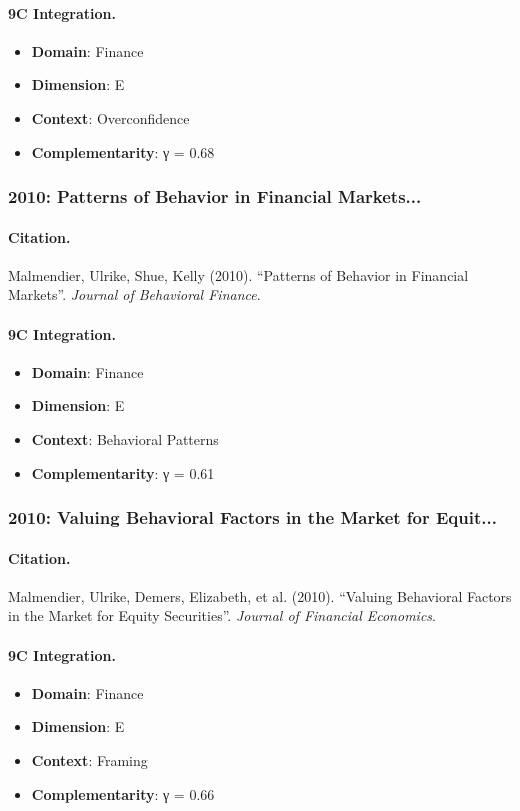 \paragraph{9C Integration.}
\begin{itemize}[nosep]
  \item \textbf{Domain}: Finance
  \item \textbf{Dimension}: E
  \item \textbf{Context}: Overconfidence
  \item \textbf{Complementarity}: γ = 0.68
\end{itemize}


\subsubsection{2010: Patterns of Behavior in Financial Markets...}

\paragraph{Citation.}
Malmendier, Ulrike, Shue, Kelly (2010). ``Patterns of Behavior in Financial Markets''. \textit{Journal of Behavioral Finance}.

\paragraph{9C Integration.}
\begin{itemize}[nosep]
  \item \textbf{Domain}: Finance
  \item \textbf{Dimension}: E
  \item \textbf{Context}: Behavioral Patterns
  \item \textbf{Complementarity}: γ = 0.61
\end{itemize}


\subsubsection{2010: Valuing Behavioral Factors in the Market for Equit...}

\paragraph{Citation.}
Malmendier, Ulrike, Demers, Elizabeth, et al. (2010). ``Valuing Behavioral Factors in the Market for Equity Securities''. \textit{Journal of Financial Economics}.

\paragraph{9C Integration.}
\begin{itemize}[nosep]
  \item \textbf{Domain}: Finance
  \item \textbf{Dimension}: E
  \item \textbf{Context}: Framing
  \item \textbf{Complementarity}: γ = 0.66
\end{itemize}


